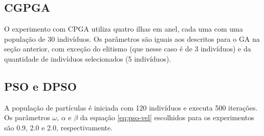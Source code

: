 \subsection{CGPGA}

O experimento com CPGA utiliza quatro ilhas em anel, cada uma com uma população de 30 indivíduos. Os parâmetros são iguais aos descritos para o GA na seção anterior, com exceção do elitismo (que nesse caso é de 3 indivíduos) e da quantidade de indivíduos selecionados (5 indivíduos).

\subsection{PSO e DPSO}

A população de partículas é iniciada com 120 indivíduos e executa 500 iterações. Os parâmetros $\omega$, $\alpha$ e $\beta$ da equação \ref{eq:pso-vel} escolhidos para os experimentos são 0.9, 2.0 e 2.0, respectivamente.